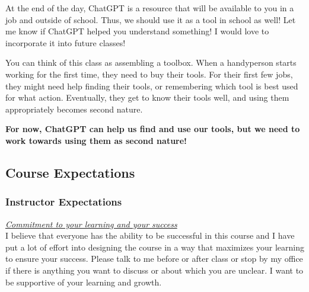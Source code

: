 \documentclass[
  letterpaper,
  DIV=11,
  numbers=noendperiod]{scrartcl}
\begin{document}
At the end of the day, ChatGPT is a resource that will be available to
you in a job and outside of school. Thus, we should use it as a tool in
school as well! Let me know if ChatGPT helped you understand something!
I would love to incorporate it into future classes!

\begin{tcolorbox}[enhanced jigsaw, bottomrule=.15mm, coltitle=black, toptitle=1mm, toprule=.15mm, opacityback=0, colbacktitle=quarto-callout-important-color!10!white, breakable, titlerule=0mm, left=2mm, colframe=quarto-callout-important-color-frame, title=\textcolor{quarto-callout-important-color}{\faExclamation}\hspace{0.5em}{Important}, leftrule=.75mm, bottomtitle=1mm, arc=.35mm, rightrule=.15mm, opacitybacktitle=0.6, colback=white]

You can think of this class as assembling a toolbox. When a handyperson
starts working for the first time, they need to buy their tools. For
their first few jobs, they might need help finding their tools, or
remembering which tool is best used for what action. Eventually, they
get to know their tools well, and using them appropriately becomes
second nature.

\textbf{For now, ChatGPT can help us find and use our tools, but we need
to work towards using them as second nature!}

\end{tcolorbox}

\hypertarget{course-expectations}{%
\subsection{Course Expectations}\label{course-expectations}}

\hypertarget{instructor-expectations}{%
\subsubsection{Instructor Expectations}\label{instructor-expectations}}

\ul{\emph{Commitment to your learning and your success\\
}}I believe that everyone has the ability to be successful in this
course and I have put a lot of effort into designing the course in a way
that maximizes your learning to ensure your success. Please talk to me
before or after class or stop by my office if there is anything you want
to discuss or about which you are unclear. I want to be supportive of
your learning and growth.
\end{document}
